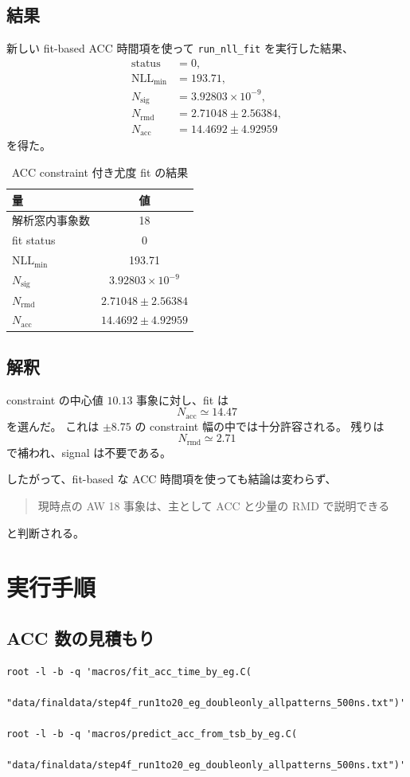 \documentclass[a4paper,11pt]{jsarticle}
\begin{document}
\subsection{結果}
新しい fit-based ACC 時間項を使って
\texttt{run\_nll\_fit} を実行した結果、
\begin{align}
\mathrm{status} &= 0,\\
\mathrm{NLL}_{\min} &= 193.71,\\
N_{\mathrm{sig}} &= 3.92803\times 10^{-9},\\
N_{\mathrm{rmd}} &= 2.71048 \pm 2.56384,\\
N_{\mathrm{acc}} &= 14.4692 \pm 4.92959
\end{align}
を得た。

\begin{table}[htbp]
\centering
\caption{ACC constraint 付き尤度 fit の結果}
\label{tab:nllresult}
\begin{tabular}{lc}
\toprule
量 & 値 \\
\midrule
解析窓内事象数 & 18 \\
fit status & 0 \\
\(\mathrm{NLL}_{\min}\) & 193.71 \\
\(N_{\mathrm{sig}}\) & \(3.92803\times 10^{-9}\) \\
\(N_{\mathrm{rmd}}\) & \(2.71048 \pm 2.56384\) \\
\(N_{\mathrm{acc}}\) & \(14.4692 \pm 4.92959\) \\
\bottomrule
\end{tabular}
\end{table}

\subsection{解釈}
constraint の中心値 \(10.13\) 事象に対し、fit は
\[
N_{\mathrm{acc}}\simeq 14.47
\]
を選んだ。
これは \(\pm 8.75\) の constraint 幅の中では十分許容される。
残りは
\[
N_{\mathrm{rmd}}\simeq 2.71
\]
で補われ、signal は不要である。

したがって、fit-based な ACC 時間項を使っても結論は変わらず、
\begin{quote}
現時点の AW 18 事象は、主として ACC と少量の RMD で説明できる
\end{quote}
と判断される。

\section{実行手順}
\subsection{ACC 数の見積もり}
\begin{verbatim}
root -l -b -q 'macros/fit_acc_time_by_eg.C(
  "data/finaldata/step4f_run1to20_eg_doubleonly_allpatterns_500ns.txt")'

root -l -b -q 'macros/predict_acc_from_tsb_by_eg.C(
  "data/finaldata/step4f_run1to20_eg_doubleonly_allpatterns_500ns.txt")'
\end{verbatim}
\end{document}
